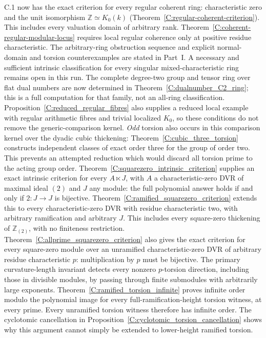 C.1 now has the exact criterion for every regular coherent ring:
characteristic zero and the unit isomorphism $\mathbb Z\simeq K_0(k)$
(Theorem~\ref{C:regular-coherent-criterion}). This includes every
valuation domain of arbitrary rank.
Theorem~\ref{C:coherent-regular-modular-locus} requires local regular
coherence only at positive residue characteristic. The arbitrary-ring
obstruction sequence and explicit
normal-domain and torsion counterexamples are stated in Part~I. A necessary
and sufficient intrinsic classification for every singular mixed-characteristic
ring remains open in this run. The complete degree-two group and tensor
ring over flat dual numbers are now determined in
Theorem~\ref{C:dualnumber_C2_ring}; this is a full computation for that
family, not an all-ring classification. Proposition~\ref{C:reduced_regular_fibres}
also supplies a reduced local example with regular arithmetic fibres
and trivial localized $K_0$, so these conditions do not remove the
generic-comparison kernel.
\emph{Odd} torsion also occurs in this comparison kernel over the
dyadic cubic thickening: Theorem~\ref{C:cubic_three_torsion} constructs
independent classes of exact order three for the group of order two.
This prevents an attempted reduction which would discard all torsion
prime to the acting group order.
Theorem~\ref{C:squarezero_intrinsic_criterion} supplies an exact
intrinsic criterion for every $A\ltimes J$, with $A$ a
characteristic-zero DVR of maximal ideal $(2)$ and $J$ any module:
the full polynomial answer holds if and only if $2:J\to J$ is
bijective. Theorem~\ref{C:ramified_squarezero_criterion} extends this to
every characteristic-zero DVR with residue characteristic two,
with arbitrary ramification and arbitrary $J$. This includes every
square-zero thickening of $\mathbb Z_{(2)}$, with no finiteness
restriction. Theorem~\ref{C:allprime_squarezero_criterion}
also gives the exact criterion for every square-zero module over
an unramified characteristic-zero DVR of arbitrary residue
characteristic $p$: multiplication by $p$ must be bijective.
The primary curvature-length invariant detects every nonzero
$p$-torsion direction, including those in divisible modules, by
passing through finite submodules with arbitrarily large exponents.
Theorem~\ref{C:ramified_torsion_infinite} proves infinite order modulo
the polynomial image for every full-ramification-height torsion witness,
at every prime. Every unramified torsion witness therefore has infinite
order. The cyclotomic cancellation in
Proposition~\ref{C:cyclotomic_torsion_cancellation} shows why this argument
cannot simply be extended to lower-height ramified torsion.
